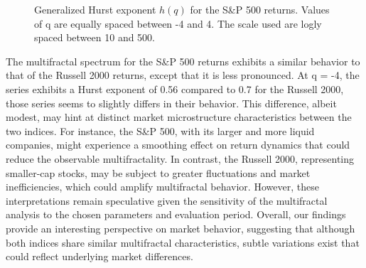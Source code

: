 \documentclass[11pt]{extarticle}
\begin{document}
\begin{figure}[htbp]
    \centering
    \caption{Generalized Hurst exponent $h(q)$ for the S\&P 500 returns. Values of q are equally spaced between -4 and 4.
    The scale used are logly spaced between 10 and 500.}
\end{figure}

\FloatBarrier

The multifractal spectrum for the S\&P 500 returns exhibits a similar behavior to that of the Russell 2000 returns,
except that it is less pronounced. At q = -4, the series exhibits a Hurst exponent of 0.56 compared to 0.7 for the
Russell 2000, those series seems to slightly differs in their behavior.
This difference, albeit modest, may hint at distinct market microstructure characteristics between the two indices.
For instance, the S\&P 500, with its larger and more liquid companies, might experience a smoothing effect on return
dynamics that could reduce the observable multifractality. In contrast, the Russell 2000, representing smaller-cap
stocks, may be subject to greater fluctuations and market inefficiencies, which could amplify multifractal behavior.
However, these interpretations remain speculative given the sensitivity of the multifractal analysis to the chosen
parameters and evaluation period.
Overall, our findings provide an interesting perspective on market behavior, suggesting that although both indices
share similar multifractal characteristics, subtle variations exist that could reflect underlying market differences.
\end{document}
